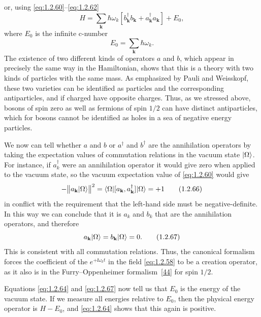 or, using \eqref{eq:1.2.60}--\eqref{eq:1.2.62}
\begin{equation}
  H=\sum_{\mathbf k}\hbar\omega_k
  \left[b^{\dagger}_{\mathbf k}b_{\mathbf k}
       +a^{\dagger}_{\mathbf k}a_{\mathbf k}\right]+E_0,
  \tag{1.2.64}\label{eq:1.2.64}
\end{equation}
where $E_0$ is the infinite c-number
\begin{equation}
  E_0=\sum_{\mathbf k}\hbar\omega_k.
  \tag{1.2.65}\label{eq:1.2.65}
\end{equation}
The existence of two different kinds of operators $a$ and $b$, which appear
in precisely the same way in the Hamiltonian, shows that this is a theory
with two kinds of particles with the same mass. As emphasized by Pauli and
Weisskopf, these two varieties can be identified as particles and the
corresponding antiparticles, and if charged have opposite charges. Thus, as
we stressed above, bosons of spin zero as well as fermions of spin $1/2$ can
have distinct antiparticles, which for bosons cannot be identified as holes
in a sea of negative energy particles.

We now can tell whether $a$ and $b$ or $a^{\dagger}$ and $b^{\dagger}$ are
the annihilation operators by taking the expectation values of commutation
relations in the vacuum state $\lvert \Omega\rangle$. For instance, if
$a_k^{\dagger}$ were an annihilation operator it would give zero when applied
to the vacuum state, so the vacuum expectation value of \eqref{eq:1.2.60} would give
\begin{equation}
  -\bigl\|a_{\mathbf k}\lvert \Omega\rangle\bigr\|^2
  =\langle \Omega\rvert[a_{\mathbf k},a^{\dagger}_{\mathbf k}]\lvert \Omega\rangle=+1
  \tag{1.2.66}\label{eq:1.2.66}
\end{equation}
in conflict with the requirement that the left-hand side must be
negative-definite. In this way we can conclude that it is $a_k$ and $b_k$ that
are the annihilation operators, and therefore
\begin{equation}
  a_{\mathbf k}\lvert \Omega\rangle=b_{\mathbf k}\lvert \Omega\rangle=0.
  \tag{1.2.67}\label{eq:1.2.67}
\end{equation}
This is consistent with all commutation relations. Thus, the canonical
formalism forces the coefficient of the $e^{+\ii\omega_kt}$ in the field \eqref{eq:1.2.58}
to be a creation operator, as it also is in the Furry--Oppenheimer
formalism~\hyperref[ref:1.44]{[44]} for spin $1/2$.

Equations \eqref{eq:1.2.64} and \eqref{eq:1.2.67} now tell us that $E_0$ is the energy of the
vacuum state. If we measure all energies relative to $E_0$, then the physical
energy operator is $H-E_0$, and \eqref{eq:1.2.64} shows that this again is positive.


